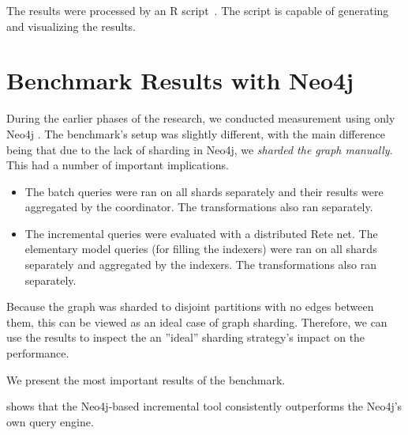 The results were processed by an R script~\cite{RProject}. The script is capable of generating and visualizing the results. 


\section{Benchmark Results with Neo4j}

During the earlier phases of the research, we conducted measurement using only Neo4j \cite{Izso:2012:ODD:2428516.2428523}. The benchmark's setup was slightly different, %
with the main difference being that %
%
due to the lack of sharding in Neo4j, we \emph{sharded the graph manually}. This had a number of important implications.
  \begin{itemize}
    \item The batch queries were ran on all shards separately and their results were aggregated by the coordinator. The transformations also ran separately. 
    \item The incremental queries were evaluated with a distributed Rete net. The elementary model queries (for filling the indexers) were ran on all shards separately and aggregated by the indexers. The transformations also ran separately.

  \end{itemize}

Because the graph was sharded to disjoint partitions with no edges between them, this can be viewed as an ideal case of graph sharding. Therefore, we can use the results to inspect the an ''ideal'' sharding strategy's impact on the performance.

We present the most important results of the benchmark.

 shows that the Neo4j-based incremental tool consistently outperforms the Neo4j's own query engine.

